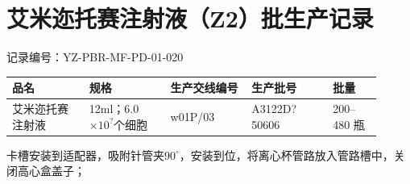 \documentclass[UTF8,10pt,a4paper,fontset=fandol]{ctexart}
\newcommand{\fieldvalue}[1]{#1}
\newcommand{\handwritten}[1]{#1}
\begin{document}

\newpage

\section{艾米迩托赛注射液（Z2）批生产记录}

\noindent
记录编号：YZ-PBR-MF-PD-01-020

\begin{center}
\begin{tabular}{|p{0.19\linewidth}|p{0.20\linewidth}|p{0.20\linewidth}|p{0.20\linewidth}|p{0.12\linewidth}|}
\hline
\centering 品名 & \centering 规格 & \centering 生产交线编号 & \centering 生产批号 & \centering 批量\\
\hline
艾米迩托赛注射液 &
12ml；6.0$\times 10^{?}$个细胞 &
\fieldvalue{\handwritten{w01P/03}} &
\fieldvalue{\handwritten{A3122D?50606}} &
200--480 瓶\\
\hline
\end{tabular}
\end{center}

\noindent
卡槽安装到适配器，吸附针管夹$90^\circ$，安装到位，将离心杯管路放入管路槽中，关闭高心盒盖子；
\end{document}
